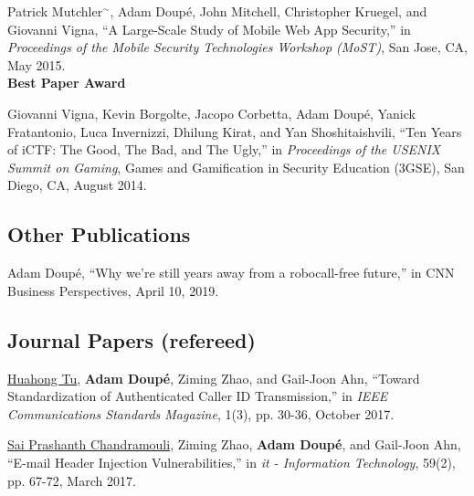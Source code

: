 \documentclass[11pt,letterpaper,sans]{moderncv}
\begin{document}
\begin{etaremune}
\item Patrick Mutchler$^{\sim}$, Adam Doup\'e, John Mitchell,
  Christopher Kruegel, and Giovanni Vigna, ``A Large-Scale Study of
  Mobile Web App Security,'' in \emph{Proceedings of the Mobile
    Security Technologies Workshop (MoST)}, San Jose, CA, May 2015. \\
  \textbf{Best Paper Award}

\item Giovanni Vigna, Kevin Borgolte, Jacopo Corbetta, Adam
  Doup\'e, Yanick Fratantonio, Luca Invernizzi, Dhilung Kirat, and
  Yan Shoshitaishvili, ``Ten Years of iCTF: The Good, The Bad, and The
  Ugly,'' in \emph{Proceedings of the USENIX Summit on Gaming}, Games
  and Gamification in Security Education (3GSE), San Diego, CA, August
  2014.

\end{etaremune}

\subsection{Other Publications}

\begin{etaremune}

  \item Adam Doup\'e, ``Why we're still years away from a robocall-free future,'' in CNN Business Perspectives, April 10, 2019. 

\end{etaremune}

\subsection{Journal Papers (refereed)}

\begin{etaremune}

\item \underline{Huahong Tu}, \textbf{Adam Doup\'e}, Ziming Zhao, and
  Gail-Joon Ahn, ``Toward Standardization of Authenticated Caller ID
  Transmission,'' in \emph{IEEE Communications Standards Magazine},
    1(3), pp. 30-36, October 2017.

\item \underline{Sai Prashanth Chandramouli}, Ziming Zhao,
  \textbf{Adam Doup\'e}, and Gail-Joon Ahn, ``E-mail Header Injection
  Vulnerabilities,'' in \emph{it - Information Technology}, 59(2), pp.
  67-72, March 2017.

\end{etaremune}
\end{document}
